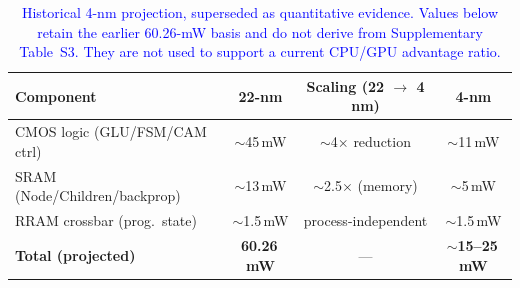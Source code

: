 \begin{table}[!htbp]
\centering
\footnotesize
\caption{\textcolor{blue}{Historical 4-nm projection, superseded as quantitative evidence. Values below retain the earlier 60.26-mW basis and do not derive from Supplementary Table~S3. They are not used to support a current CPU/GPU advantage ratio.}}
\label{tab:supp_iso_process}
\setlength{\tabcolsep}{4pt}
\begin{tabular}{@{}lccc@{}}
\toprule
Component & 22-nm & Scaling (22 $\to$ 4 nm) & 4-nm \\
\midrule
CMOS logic (GLU/FSM/CAM ctrl) & $\sim$45\,mW & $\sim$4$\times$ reduction     & $\sim$11\,mW \\
SRAM (Node/Children/backprop) & $\sim$13\,mW & $\sim$2.5$\times$ (memory)    & $\sim$5\,mW  \\
RRAM crossbar (prog.\ state)  & $\sim$1.5\,mW & process-independent           & $\sim$1.5\,mW \\
\midrule
\textbf{Total (projected)}    & \textbf{60.26\,mW} & --- & \textbf{$\sim$15--25\,mW} \\
\bottomrule
\end{tabular}
\end{table}
